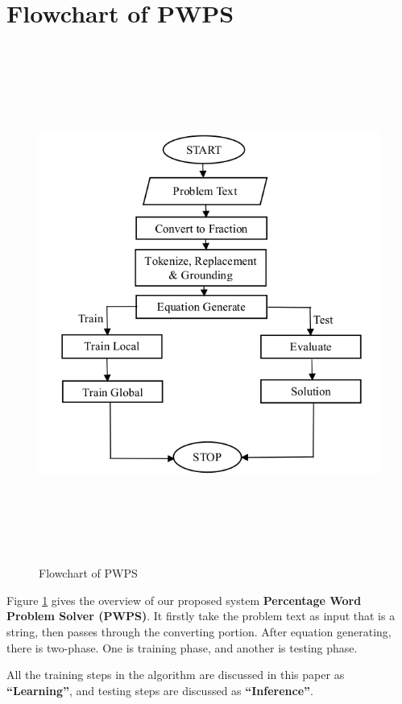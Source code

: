 \documentclass[document.tex]{subfiles}
\begin{document}
\section{Flowchart of PWPS}
	\begin{figure}
		\begin{center}
		\includegraphics[height=17cm]{imgs/flowchart.png}
	\end{center}
		\caption{Flowchart of PWPS}
		\label{fig:flowchart}
	\end{figure}
\noindent Figure \ref{fig:flowchart} gives the overview of our proposed system \textbf{Percentage Word Problem Solver (PWPS)}. It firstly take the problem text as input that is a string, then passes through the converting portion. After equation generating, there is two-phase. One is training phase, and another is testing phase. 

All the training steps in the algorithm are discussed in this paper as \textbf{“Learning”}, and testing steps are discussed as \textbf{“Inference”}. 
\end{document}
